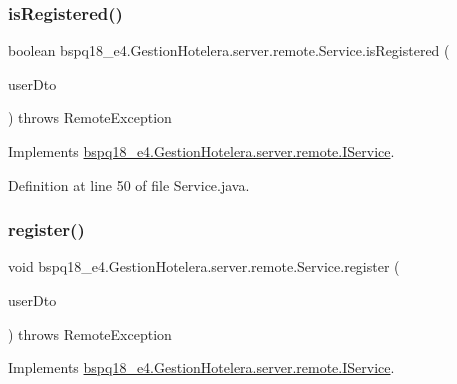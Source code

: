 \subsubsection{\texorpdfstring{is\+Registered()}{isRegistered()}}
{\footnotesize\ttfamily boolean bspq18\+\_\+e4.\+Gestion\+Hotelera.\+server.\+remote.\+Service.\+is\+Registered (\begin{DoxyParamCaption}\item[{\mbox{\hyperlink{classbspq18__e4_1_1_gestion_hotelera_1_1server_1_1dto_1_1_user_d_t_o}{User\+D\+TO}}}]{user\+Dto }\end{DoxyParamCaption}) throws Remote\+Exception}



Implements \mbox{\hyperlink{interfacebspq18__e4_1_1_gestion_hotelera_1_1server_1_1remote_1_1_i_service_a10213b1b81f91e9d159f2524625375e6}{bspq18\+\_\+e4.\+Gestion\+Hotelera.\+server.\+remote.\+I\+Service}}.



Definition at line 50 of file Service.\+java.

\mbox{\label{classbspq18__e4_1_1_gestion_hotelera_1_1server_1_1remote_1_1_service_adcb6c2c890c84852528743a2ed77818a}} 
\subsubsection{\texorpdfstring{register()}{register()}}
{\footnotesize\ttfamily void bspq18\+\_\+e4.\+Gestion\+Hotelera.\+server.\+remote.\+Service.\+register (\begin{DoxyParamCaption}\item[{\mbox{\hyperlink{classbspq18__e4_1_1_gestion_hotelera_1_1server_1_1dto_1_1_user_d_t_o}{User\+D\+TO}}}]{user\+Dto }\end{DoxyParamCaption}) throws Remote\+Exception}



Implements \mbox{\hyperlink{interfacebspq18__e4_1_1_gestion_hotelera_1_1server_1_1remote_1_1_i_service_a5a0aab1bc25c952e69cdd451377bf47d}{bspq18\+\_\+e4.\+Gestion\+Hotelera.\+server.\+remote.\+I\+Service}}.




